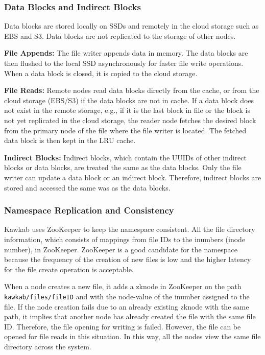 \documentclass[]{article}
\newcommand{\subtopic}[1]{\vspace{1.5pt} \noindent \textbf{#1}}
\begin{document}
{\subsubsection{Data Blocks and Indirect Blocks} Data blocks are stored locally
on SSDs and remotely in the cloud storage such as EBS and S3. Data blocks are
not replicated to the storage of other nodes.

\subtopic{File Appends:} The file writer appends data in memory. The data
blocks are then flushed to the local SSD asynchronously for faster file write
operations. When a data block is closed, it is copied to the cloud storage.

\subtopic{File Reads:} Remote nodes read data blocks directly from the cache,
or from the cloud storage (EBS/S3) if the data blocks are not in cache.  If a
data block does not exist in the remote storage, e.g., if it is the last block
in file or the block is not yet replicated in the cloud storage, the reader
node fetches the desired block from the primary node of the file where the file
writer is located. The fetched data block is then kept in the LRU cache.

\subtopic{Indirect Blocks:} Indirect blocks, which contain the UUIDs of other
indirect blocks or data blocks, are treated the same as the data blocks.
Only the file writer can update a data block or an indirect block. Therefore,
indirect blocks are stored and accessed the same was as the data blocks.


\subsubsection{Namespace Replication and Consistency}
Kawkab uses ZooKeeper to keep the namespace consistent. All the file
directory information, which consists of mappings from file IDs to the
inumbers (inode number), in ZooKeeper. ZooKeeper is a good candidate
for the namespace because the frequency of the creation of new files is low
and the higher latency for the file create operation is acceptable.

When a node creates a new file, it adds a zknode in ZooKeeper on the path
\texttt{kawkab/files/fileID} and with the node-value of the inumber assigned to
the file. If the node creation fails due to an already existing zknode with
the same path, it implies that another node has already created the file with the same
file ID. Therefore, the file opening for writing is failed. However, the file can be
opened for file reads in this situation. In this way, all the nodes view
the same file directory across the system.

}
\end{document}
